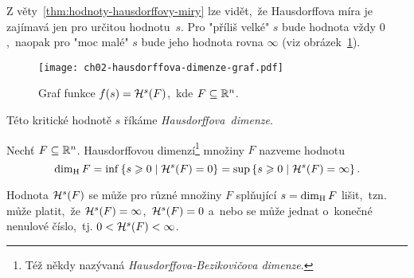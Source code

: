 Z věty~\ref{thm:hodnoty-hausdorffovy-miry} lze vidět,~že Hausdorffova míra je zajímavá jen pro určitou hodnotu~$s$. Pro "příliš velké" $s$ bude hodnota vždy $0$,~naopak pro "moc malé" $s$ bude jeho hodnota rovna $\infty$ (viz obrázek~\ref{fig:hausdorffova-dimenze-graf}).
\begin{figure}[h]
    \centering
    \texttt{[image: ch02-hausdorffova-dimenze-graf.pdf]}
    \caption{Graf funkce $f(s)=\mathcal{H}^{s}(F)$,~kde $F\subseteq\mathbb{R}^n$.}
    \label{fig:hausdorffova-dimenze-graf}
\end{figure}
Této kritické hodnotě $s$ říkáme \emph{Hausdorffova~dimenze}.
\begin{definition}\label{def:hausdorffova-dimenze}
    Nechť $F\subseteq\mathbb{R}^n$. Hausdorffovou dimenzí\footnote{Též někdy nazývaná \emph{Hausdorffova-Bezikovičova dimenze}. } množiny $F$ nazveme hodnotu
    \[\operatorname{dim_H}{F}=\inf\left\{s\geqslant 0\mid\mathcal{H}^{s}(F)=0\right\}=\sup\left\{s\geqslant 0\mid\mathcal{H}^{s}(F)=\infty\right\}.\]
\end{definition}
Hodnota $\mathcal{H}^{s}(F)$ se může pro různé množiny $F$ splňující $s=\operatorname{dim_H}{F}$ lišit,~tzn. může platit,~že $\mathcal{H}^{s}(F)=\infty$,~$\mathcal{H}^{s}(F)=0$ a~nebo se může jednat o~konečné nenulové číslo,~tj. $0<\mathcal{H}^{s}(F)<\infty$.

